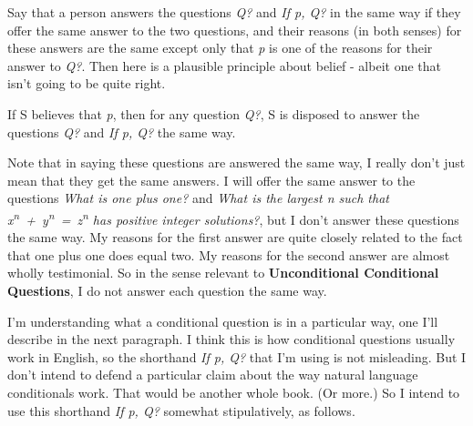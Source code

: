 \documentclass[
  11pt,
]{book}
\providecommand{\tightlist}{%
  \setlength{\itemsep}{0pt}\setlength{\parskip}{0pt}}
\begin{document}
Say that a person answers the questions \emph{Q?} and \emph{If p, Q?} in the same way if they offer the same answer to the two questions, and their reasons (in both senses) for these answers are the same except only that \emph{p} is one of the reasons for their answer to \emph{Q?}. Then here is a plausible principle about belief - albeit one that isn't going to be quite right.

\begin{description}
\tightlist
\item[Unrestricted Conditional Questions]
If S believes that \emph{p}, then for any question \emph{Q?}, S is disposed to answer the questions \emph{Q?} and \emph{If p, Q?} the same way.
\end{description}

Note that in saying these questions are answered the same way, I really don't just mean that they get the same answers. I will offer the same answer to the questions \emph{What is one plus one?} and \emph{What is the largest n such that x\textsuperscript{n}~+~y\textsuperscript{n}~=~z\textsuperscript{n} has positive integer solutions?}, but I don't answer these questions the same way. My reasons for the first answer are quite closely related to the fact that one plus one does equal two. My reasons for the second answer are almost wholly testimonial. So in the sense relevant to \textbf{Unconditional Conditional Questions}, I do not answer each question the same way.

I'm understanding what a conditional question is in a particular way, one I'll describe in the next paragraph. I think this is how conditional questions usually work in English, so the shorthand \emph{If p, Q?} that I'm using is not misleading. But I don't intend to defend a particular claim about the way natural language conditionals work. That would be another whole book. (Or more.) So I intend to use this shorthand \emph{If p, Q?} somewhat stipulatively, as follows.
\end{document}
